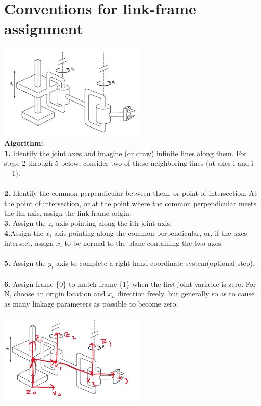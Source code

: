 \documentclass{article}
\begin{document}
\section{Conventions for link-frame assignment}
\includegraphics[width=7cm]{PRR.png}\\
\textbf{Algorithm: }\\
\textbf{1.} Identify the joint axes and imagine (or draw) infinite lines along them. For
steps 2 through 5 below, consider two of these neighboring lines (at axes i and
i + 1).\\\\
\textbf{2.} Identify the common perpendicular between them, or point of intersection.
At the point of intersection, or at the point where the common perpendicular
meets the ith axis, assign the link-frame origin.\\
\textbf{3.} Assign the $z_i$ axis pointing along the ith joint axis.\\
\textbf{4.}Assign the $x_i$ axis pointing along the common perpendicular, or, if the axes
intersect, assign $x_i$ to be normal to the plane containing the two axes.\\\\
\textbf{5.} Assign the $y_i$ axis to complete a right-hand coordinate system(optional step).\\\\
\textbf{6.} Assign frame \{0\} to match frame \{1\} when the first joint variable is zero. For {N}, choose an
origin location and $x_n$ direction freely, but generally so as to cause as many
linkage parameters as possible to become zero.\\\\
\includegraphics[width=7cm]{PRR_labeled.png}
\end{document}
